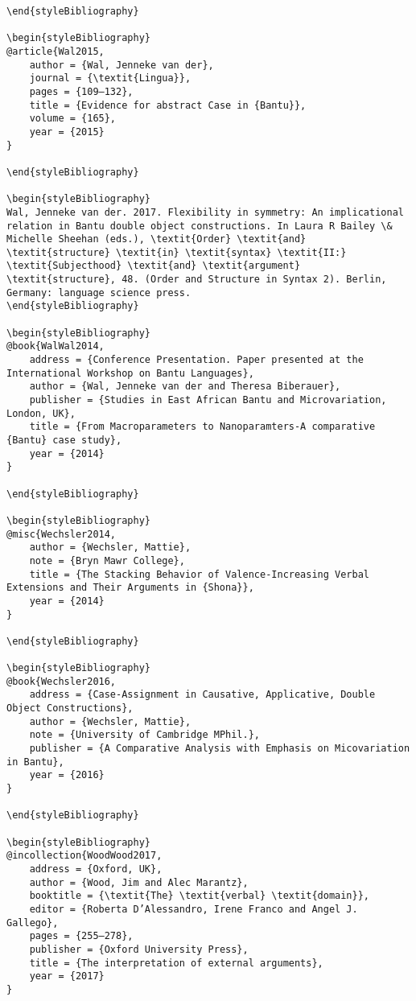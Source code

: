 \documentclass[output=paper]{langscibook}
\begin{document}
\begin{verbatim}
\end{styleBibliography}

\begin{styleBibliography}
@article{Wal2015,
	author = {Wal, Jenneke van der},
	journal = {\textit{Lingua}},
	pages = {109–132},
	title = {Evidence for abstract Case in {Bantu}},
	volume = {165},
	year = {2015}
}

\end{styleBibliography}

\begin{styleBibliography}
Wal, Jenneke van der. 2017. Flexibility in symmetry: An implicational relation in Bantu double object constructions. In Laura R Bailey \& Michelle Sheehan (eds.), \textit{Order} \textit{and} \textit{structure} \textit{in} \textit{syntax} \textit{II:} \textit{Subjecthood} \textit{and} \textit{argument} \textit{structure}, 48. (Order and Structure in Syntax 2). Berlin, Germany: language science press.
\end{styleBibliography}

\begin{styleBibliography}
@book{WalWal2014,
	address = {Conference Presentation. Paper presented at the International Workshop on Bantu Languages},
	author = {Wal, Jenneke van der and Theresa Biberauer},
	publisher = {Studies in East African Bantu and Microvariation, London, UK},
	title = {From Macroparameters to Nanoparamters-A comparative {Bantu} case study},
	year = {2014}
}

\end{styleBibliography}

\begin{styleBibliography}
@misc{Wechsler2014,
	author = {Wechsler, Mattie},
	note = {Bryn Mawr College},
	title = {The Stacking Behavior of Valence-Increasing Verbal Extensions and Their Arguments in {Shona}},
	year = {2014}
}

\end{styleBibliography}

\begin{styleBibliography}
@book{Wechsler2016,
	address = {Case-Assignment in Causative, Applicative, Double Object Constructions},
	author = {Wechsler, Mattie},
	note = {University of Cambridge MPhil.},
	publisher = {A Comparative Analysis with Emphasis on Micovariation in Bantu},
	year = {2016}
}

\end{styleBibliography}

\begin{styleBibliography}
@incollection{WoodWood2017,
	address = {Oxford, UK},
	author = {Wood, Jim and Alec Marantz},
	booktitle = {\textit{The} \textit{verbal} \textit{domain}},
	editor = {Roberta D’Alessandro, Irene Franco and Angel J. Gallego},
	pages = {255–278},
	publisher = {Oxford University Press},
	title = {The interpretation of external arguments},
	year = {2017}
}


\end{verbatim}
\end{document}
